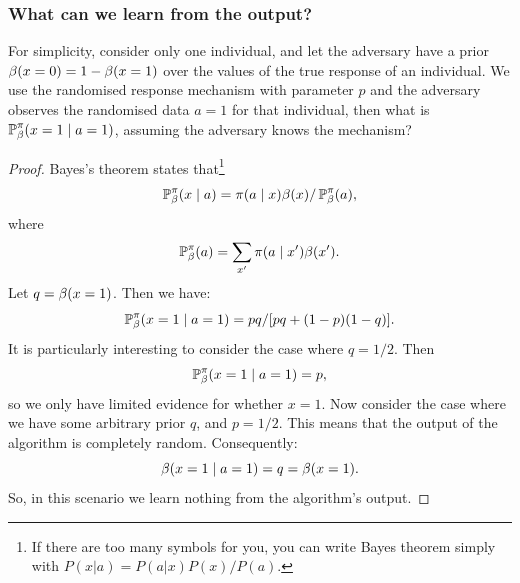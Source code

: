 \begin{frame}
  \frametitle{What can we learn from the output?}

  \begin{example}
    For simplicity, consider only one individual, and let the
    adversary have a prior $\beta(x = 0) = 1 - \beta(x = 1)$ over the
    values of the true response of an individual. We use the
    randomised response mechanism with parameter $p$ and the
    adversary observes the randomised data $a = 1$ for that
    individual, then what is $\mathop{\mbox{\ensuremath{\mathbb{P}}}}\nolimits^\pi_\beta(x = 1 \mid a = 1)$, assuming the
    adversary knows the mechanism?
  \end{example}
  \begin{proof}
    Bayes's theorem states that\footnote{If there are too many symbols for you, you can write Bayes theorem simply with $P(x | a) = P(a | x) P(x) / P(a)$.}
    \[
      \mathop{\mbox{\ensuremath{\mathbb{P}}}}\nolimits^\pi_\beta(x \mid a) = \pi(a \mid x) \beta(x) / \mathop{\mbox{\ensuremath{\mathbb{P}}}}\nolimits^\pi_\beta(a),
    \]
    where
    \[
      \mathop{\mbox{\ensuremath{\mathbb{P}}}}\nolimits^\pi_\beta(a) = \sum_{x'} \pi(a \mid x') \beta(x').
    \]
    Let $q = \beta(x = 1)$. Then we have:
    \[
      \mathop{\mbox{\ensuremath{\mathbb{P}}}}\nolimits^\pi_\beta(x = 1 \mid a = 1) = pq / [pq + (1-p)(1 - q)].
    \]
    It is particularly interesting to consider the case where $q = 1/2$. Then
    \[
      \mathop{\mbox{\ensuremath{\mathbb{P}}}}\nolimits^\pi_\beta(x = 1 \mid a = 1) = p,
    \]
    so we only have limited evidence for whether $x=1$. Now consider the case where we have some arbitrary prior $q$, and $p=1/2$. This means that the output of the algorithm is completely random. Consequently:
    \[
      \beta(x = 1 \mid a = 1) = q = \beta(x=1).
    \]
    So, in this scenario we learn nothing from the algorithm's output.
  \end{proof}
\end{frame}


